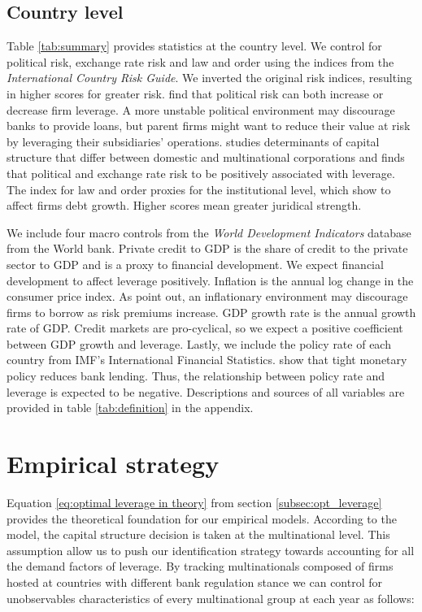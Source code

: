 \documentclass[12pt]{article}
\begin{document}
\subsection{Country level} 
 \label{subsec:country}
	Table \ref{tab:summary} provides statistics at the country level. We control for political risk, exchange rate risk and law and order using the indices from the \textit{International Country Risk Guide}. We inverted the original risk indices, resulting in higher scores for greater risk. \cite*{kesternich2010afraid} find that political risk can both increase or decrease firm leverage. A more unstable political environment may discourage banks to provide loans, but parent firms might want to reduce their value at risk by leveraging their subsidiaries' operations. \cite*{burgman1996empirical} studies determinants of capital structure that differ between domestic and multinational corporations and finds that political and exchange rate risk to be positively associated with leverage. The index for law and order proxies for the institutional level, which \cite*{demirgucc1998law} show to affect firms debt growth. Higher scores mean greater juridical strength.
	
	 We include four macro controls from the \textit{World Development Indicators} database from the World bank. Private credit to GDP is the share of credit to the private sector to GDP and is a proxy to financial development. We expect financial development to affect leverage positively. Inflation is the annual log change in the consumer price index. As \cite{huizinga2008capital} point out, an inflationary environment may discourage firms to borrow as risk premiums increase. GDP growth rate is the annual growth rate of GDP. Credit markets are pro-cyclical, so we expect a positive coefficient between GDP growth and leverage. Lastly, we include the policy rate of each country from IMF's International Financial Statistics. \cite*{jimenez2012credit} show that tight monetary policy reduces bank lending. Thus, the relationship between policy rate and leverage is expected to be negative. Descriptions and sources of all variables are provided in table \ref{tab:definition} in the appendix.
			
	\section{Empirical strategy}
	\label{sec:strategy}
	Equation \ref{eq:optimal leverage in theory} from section \ref{subsec:opt_leverage} provides the theoretical foundation for our empirical models. According to the model, the capital structure decision is taken at the multinational level. This assumption allow us to push our identification strategy towards accounting for all the demand factors of leverage. By tracking multinationals composed of firms hosted at countries with different bank regulation stance we can control for unobservables characteristics of every multinational group at each year as follows:   
	
\end{document}
